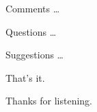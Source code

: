 \documentclass[handout]{beamer}
\begin{document}
\begin{frame}
\Huge{\centerline{Comments \dots}}
\Huge{\centerline{Questions \dots}}
\Huge{\centerline{Suggestions \dots}}
\end{frame}


\begin{frame}
\Huge{\centerline{That's it.}}
\Huge{\centerline{Thanks for listening.}}
\end{frame}

\end{document}
